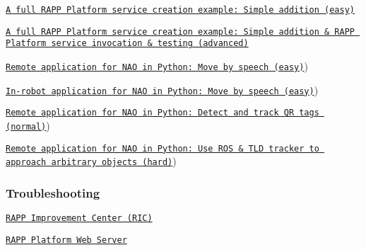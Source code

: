\begin{DoxyItemize}
\item \href{https://github.com/rapp-project/rapp-platform/wiki/A-full-RAPP-Platform-service-creation-example}{\tt A full R\-A\-P\-P Platform service creation example\-: Simple addition (easy)}
\item \href{https://github.com/rapp-project/rapp-platform/wiki/A-full-RAPP-Platform-service-creation-example-advanced}{\tt A full R\-A\-P\-P Platform service creation example\-: Simple addition \& R\-A\-P\-P Platform service invocation \& testing (advanced)}
\item \href{https://github.com/rapp-project/rapp-platform/wiki/Create-a-remote-robotic-application-for-NAO-in-Python-(novice}{\tt Remote application for N\-A\-O in Python\-: Move by speech (easy)})
\item \href{https://github.com/rapp-project/rapp-platform/wiki/Create-an-in-robot-application-for-NAO-in-Python-(novice}{\tt In-\/robot application for N\-A\-O in Python\-: Move by speech (easy)})
\item \href{https://github.com/rapp-project/rapp-platform/wiki/Remote-application-for-NAO-in-Python:-Detect-and-track-QR-tags-(normal}{\tt Remote application for N\-A\-O in Python\-: Detect and track Q\-R tags (normal)})
\item \href{https://github.com/rapp-project/rapp-platform/wiki/Remote-application-for-NAO-in-Python:-Use-ROS-&-TLD-tracker-to-approach-arbitrary-objects-(hard}{\tt Remote application for N\-A\-O in Python\-: Use R\-O\-S \& T\-L\-D tracker to approach arbitrary objects (hard)})
\end{DoxyItemize}

\subsubsection*{Troubleshooting}


\begin{DoxyItemize}
\item \href{https://github.com/rapp-project/rapp-platform/wiki/Troubleshooting-RAPP-Improvement-Center}{\tt R\-A\-P\-P Improvement Center (R\-I\-C)}
\item \href{https://github.com/rapp-project/rapp-platform/wiki/Troubleshooting-RAPP-Platform-Web-Server}{\tt R\-A\-P\-P Platform Web Server} 
\end{DoxyItemize}